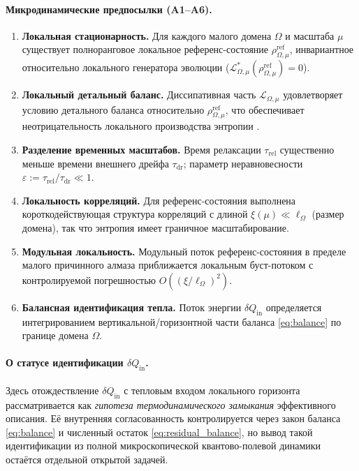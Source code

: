 \documentclass[11pt,a4paper]{article}
\theoremstyle{definition}
\theoremstyle{plain}
\theoremstyle{remark}
\begin{document}
\paragraph{Микродинамические предпосылки (A1--A6).}
\begin{enumerate}[label=(A\arabic*),leftmargin=*,itemsep=2pt]
\item \textbf{Локальная стационарность.}
Для каждого малого домена $\Omega$ и масштаба $\mu$ существует полноранговое локальное референс-состояние
$\rho^{\mathrm{ref}}_{\Omega,\mu}$, инвариантное относительно локального генератора эволюции
($\mathcal L_{\Omega,\mu}^{*}(\rho^{\mathrm{ref}}_{\Omega,\mu})=0$).
\item \textbf{Локальный детальный баланс.}
Диссипативная часть $\mathcal L_{\Omega,\mu}$ удовлетворяет условию детального баланса относительно
$\rho^{\mathrm{ref}}_{\Omega,\mu}$, что обеспечивает неотрицательность локального производства энтропии \cite{Spohn1978EntropyProduction}.
\item \textbf{Разделение временных масштабов.}
Время релаксации $\tau_{\mathrm{rel}}$ существенно меньше времени внешнего дрейфа
$\tau_{\mathrm{dr}}$; параметр неравновесности
$\varepsilon:=\tau_{\mathrm{rel}}/\tau_{\mathrm{dr}}\ll 1$.
\item \textbf{Локальность корреляций.}
Для референс-состояния выполнена короткодействующая структура корреляций
с длиной $\xi(\mu)\ll \ell_\Omega$ (размер домена), так что энтропия имеет граничное масштабирование.
\item \textbf{Модульная локальность.}
Модульный поток референс-состояния в пределе малого причинного алмаза
приближается локальным буст-потоком с контролируемой погрешностью
$O((\xi/\ell_\Omega)^2)$.
\item \textbf{Балансная идентификация тепла.}
Поток энергии $\delta Q_{\mathrm{in}}$ определяется интегрированием вертикальной/горизонтной части баланса
\eqref{eq:balance} по границе домена $\Omega$.
\end{enumerate}

\paragraph{О статусе идентификации $\delta Q_{\mathrm{in}}$.}
Здесь отождествление $\delta Q_{\mathrm{in}}$ с тепловым входом локального горизонта
рассматривается как \emph{гипотеза термодинамического замыкания} эффективного описания.
Её внутренняя согласованность контролируется через закон баланса \eqref{eq:balance}
и численный остаток \eqref{eq:residual_balance}, но вывод такой идентификации из полной
микроскопической квантово-полевой динамики остаётся отдельной открытой задачей.
\end{document}
